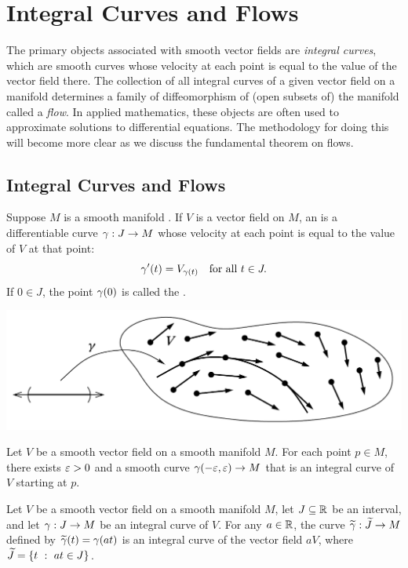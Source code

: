 \newpage\setcounter{section}{8}
\section{Integral Curves and Flows}

The primary objects associated with smooth vector fields are \textit{integral curves}, which are smooth curves whose velocity at each point is equal to the value of the vector field there. The collection of all integral curves of a given vector field on a manifold determines a family of diffeomorphism of (open subsets of) the manifold called a \textit{flow}. In applied mathematics, these objects are often used to approximate solutions to differential equations. The methodology for doing this will become more clear as we discuss the fundamental theorem on flows.

\subsection{Integral Curves and Flows}\nl

\dfng Suppose $M$ is a smooth manifold \wowob. If $V$ is a vector field on $M$, an  is a differentiable curve $\gamma:J\rightarrow M$ whose velocity at each point is equal to the value of $V$ at that point:
\[\gamma^\prime(t) = V_{\gamma(t)}\quad\text{for all }t\in J.\]
If $0\in J$, the point $\gamma(0)$ is called the .

\begin{center}
    \includegraphics[scale = 0.3]{chapter09/c9f1.png}
\end{center}

\setcounter{thm}{1}

\begin{prop}
Let $V$ be a smooth vector field on a smooth manifold $M$. For each point $p\in M$, there exists $\varepsilon > 0$ and a smooth curve $\gamma(-\varepsilon, \varepsilon)\rightarrow M$ that is an integral curve of $V$ starting at $p$.
\end{prop}


\begin{lem}
Let $V$ be a smooth vector field on a smooth manifold $M$, let $J\subseteq \mathbb{R}$ be an interval, and let $\gamma:J\rightarrow M$ be an integral curve of $V$. For any $a\in \mathbb{R}$, the curve $\widetilde{\gamma}:\widetilde J\rightarrow M$ defined by $\widetilde{\gamma}(t) = \gamma(at)$ is an integral curve of the vector field $aV$, where $\widetilde J = \{t\ :\ at \in J\}$.
\end{lem}

